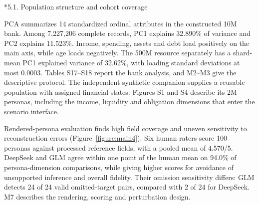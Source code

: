 \documentclass[10pt]{article}
\makeatletter
\renewcommand\subsection{\@startsection{subsection}{2}{\z@}{-1.7ex plus -.5ex minus -.2ex}{.6ex plus .2ex}{\normalfont\normalsize\mdseries}}
\makeatother
\begin{document}
\subsection*{5.1. Population structure and cohort coverage}

PCA summarizes 14 standardized ordinal attributes in the constructed 10M bank. Among 7,227,206 complete records, PC1 explains 32.890\% of variance and PC2 explains 11.523\%. Income, spending, assets and debt load positively on the main axis, while age loads negatively. The 500M resource separately has a shard-mean PC1 explained variance of 32.62\%, with loading standard deviations at most 0.0003. Tables S17--S18 report the bank analysis, and M2--M3 give the descriptive protocol. The independent synthetic companion supplies a reusable population with assigned financial states: Figures S1 and S4 describe its 2M personas, including the income, liquidity and obligation dimensions that enter the scenario interface.

Rendered-persona evaluation finds high field coverage and uneven sensitivity to reconstruction errors (Figure~\ref{figure:main4}). Six human raters score 100 personas against processed reference fields, with a pooled mean of 4.570/5. DeepSeek and GLM agree within one point of the human mean on 94.0\% of persona-dimension comparisons, while giving higher scores for avoidance of unsupported inference and overall fidelity. Their omission sensitivity differs: GLM detects 24 of 24 valid omitted-target pairs, compared with 2 of 24 for DeepSeek. M7 describes the rendering, scoring and perturbation design.
\end{document}
